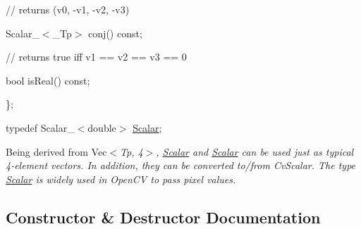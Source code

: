 {\ttfamily }

{\ttfamily }

{\ttfamily // returns (v0, -\/v1, -\/v2, -\/v3)}

{\ttfamily }

{\ttfamily }

{\ttfamily Scalar\+\_\+$<$\+\_\+\+Tp$>$ conj() const;}

{\ttfamily }

{\ttfamily }

{\ttfamily // returns true iff v1 == v2 == v3 == 0}

{\ttfamily }

{\ttfamily }

{\ttfamily bool is\+Real() const;}

{\ttfamily }

{\ttfamily }

{\ttfamily \};}

{\ttfamily }

{\ttfamily }

{\ttfamily typedef Scalar\+\_\+$<$double$>$ \mbox{\hyperlink{classorg_1_1opencv_1_1core_1_1_scalar}{Scalar}};}

{\ttfamily }

{\ttfamily }

{\ttfamily Being derived from {\ttfamily Vec$<${\itshape Tp, 4$>$, {\ttfamily \mbox{\hyperlink{classorg_1_1opencv_1_1core_1_1_scalar}{Scalar}}} and {\ttfamily \mbox{\hyperlink{classorg_1_1opencv_1_1core_1_1_scalar}{Scalar}}} can be used just as typical 4-\/element vectors. In addition, they can be converted to/from {\ttfamily Cv\+Scalar}. The type {\ttfamily \mbox{\hyperlink{classorg_1_1opencv_1_1core_1_1_scalar}{Scalar}}} is widely used in Open\+CV to pass pixel values. }}}

{\ttfamily {\ttfamily {\itshape }}}

{}

\subsection{Constructor \& Destructor Documentation}
\mbox{\label{classorg_1_1opencv_1_1core_1_1_scalar_a04b29c5652d074c999eaf60878ed859e}} 
